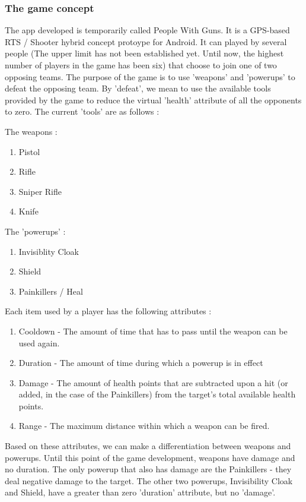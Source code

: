 \subsubsection{The game concept}
The app developed is temporarily called People With Guns. It is a GPS-based RTS
/ Shooter hybrid concept protoype for Android. It can played by several people
(The upper limit has not been established yet. Until now, the highest number of
players in the game has been six) that choose to join one of two opposing teams.
The purpose of the game is to use 'weapons' and 'powerups' to defeat the
opposing team. By 'defeat', we mean to use the available tools provided by the
game to reduce the virtual 'health' attribute of all the opponents to zero. 
The current 'tools' are as follows :\newline

The weapons : 
\begin{enumerate}
  \item Pistol
  \item Rifle
  \item Sniper Rifle
  \item Knife   
\end{enumerate}

The 'powerups' :
\begin{enumerate}
  \item Invisiblity Cloak
  \item Shield
  \item Painkillers / Heal
\end{enumerate}

Each item used by a player has the following attributes : 
\begin{enumerate}
  \item Cooldown - The amount of time that has to pass until the weapon can be
  used again.
  \item Duration - The amount of time during which a powerup is in effect 
  \item Damage - The amount of health points that are subtracted upon a hit (or
  added, in the case of the Painkillers) from the target's total available
  health points.
  \item Range - The maximum distance within which a weapon can be fired.
\end{enumerate}

Based on these attributes, we can make a differentiation between weapons and
powerups. Until this point of the game development, weapons have damage and no
duration. The only powerup that also has damage are the Painkillers - they deal
negative damage to the target. The other two powerups, Invisibility Cloak and
Shield, have a greater than zero 'duration' attribute, but no 'damage'.\newline

